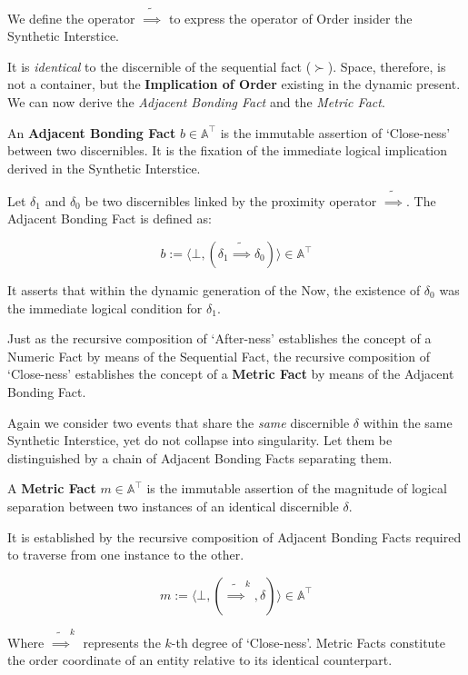 We define the operator $\tilde{\implies}$ to express the operator of Order
insider the Synthetic Interstice.

It is \textit{identical} to the discernible of the sequential fact ($\succ$).
Space, therefore, is not a container, but the \textbf{Implication of Order}
existing in the dynamic present. We can now derive the {\it Adjacent Bonding
Fact\/} and the {\it Metric Fact}.

\begin{formalism}

    An \textbf{Adjacent Bonding Fact} $b \in \mathbb{A}^\top$ is the immutable
    assertion of `Close-ness' between two discernibles. It is the fixation of
    the immediate logical implication derived in the Synthetic Interstice.

    Let $\delta_1$ and $\delta_0$ be two discernibles linked by the proximity
    operator $\tilde{\implies}$. The Adjacent Bonding Fact is defined as:

    \begin{equation}
        b := \langle \bot, (\delta_1 \tilde{\implies} \delta_0) \rangle \in \mathbb{A}^\top
    \end{equation}

    It asserts that within the dynamic generation of the Now, the existence of
    $\delta_0$ was the immediate logical condition for $\delta_1$.

\end{formalism}

Just as the recursive composition of `After-ness' establishes the concept of a
Numeric Fact by means of the Sequential Fact, the recursive composition of
`Close-ness' establishes the concept of a \textbf{Metric Fact} by means of the
Adjacent Bonding Fact.

Again we consider two events that share the \textit{same} discernible $\delta$
within the same Synthetic Interstice, yet do not collapse into singularity. Let
them be distinguished by a chain of Adjacent Bonding Facts separating them.

\begin{formalism}

    A \textbf{Metric Fact} $m \in \mathbb{A}^\top$ is the immutable assertion
    of the magnitude of logical separation between two instances of an
    identical discernible $\delta$.

    It is established by the recursive composition of Adjacent Bonding Facts
    required to traverse from one instance to the other.

    \begin{equation}
        m := \langle \bot, (\tilde{\implies}^k, \delta) \rangle \in \mathbb{A}^\top
    \end{equation}

    Where $\tilde{\implies}^k$ represents the $k$-th degree of `Close-ness'.
    Metric Facts constitute the order coordinate of an entity relative
    to its identical counterpart.

\end{formalism}

